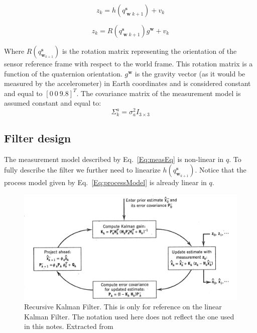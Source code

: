 \documentclass[a4paper,10pt]{article}
\DeclareMathOperator{\sensor}{\mathbf{s}}
\DeclareMathOperator{\world}{\mathbf{w}}
\begin{document}
  \begin{equation}
   z_{k} = h(q^{\sensor}_{\world{k+1}}) + v_{k}
  \end{equation}
   \begin{tcolorbox}
   \begin{equation}
    z_{k} = R(q^{\sensor}_{\world{k+1}}) g^{\world} + v_{k} 
   \end{equation}
   \label{Eq:measEq}
   \end{tcolorbox}
  
  Where $R(q^{\sensor}_{\world_{k+1}})$ is the rotation matrix representing the orientation of the sensor reference frame with respect to the world frame. This rotation matrix is a function of the quaternion orientation. $g^{\world}$ is the gravity vector (as it would be measured by the accelerometer) in Earth coordinates and is considered constant and equal to $[0~0~9.8]^T$. The covariance matrix of the measurement model is assumed constant and equal to:
  \begin{equation}
   \Sigma^{a}_{k} = \sigma^2_a I_{3\times3}
  \end{equation}
  
  \subsection{Filter design}
  The measurement model described by Eq.~\ref{Eq:measEq} is non-linear in $q$. To fully describe the filter we further need to linearize $h(q^{\sensor}_{\world_{k+1}})$. Notice that the process model given by Eq.~\ref{Eq:processModel} is already linear in $q$.
  
  \begin{figure}[ht!]
 \centering
 \includegraphics[width=\textwidth]{./fig/kalman_loop.png}
 \caption{Recursive Kalman Filter. This is only for reference on the linear Kalman Filter. The notation used here does not reflect the one used in this notes. Extracted from \cite{Grover1996}}
 \label{fig:kalmanLoop}
\end{figure}
\end{document}
